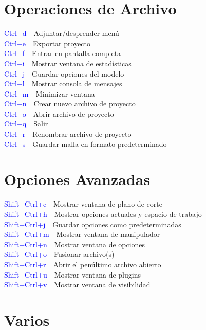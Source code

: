 \documentclass[10pt, twocolumn]{article}
\newcommand{\command}[2]{\textcolor{blue}{#1}~\dotfill{}~#2\\} %
\begin{document}
\section*{Operaciones de Archivo}

\command{Ctrl+d}{Adjuntar/desprender menú}
\command{Ctrl+e}{Exportar proyecto}
\command{Ctrl+f}{Entrar en pantalla completa}
\command{Ctrl+i}{Mostrar ventana de estadísticas}
\command{Ctrl+j}{Guardar opciones del modelo}
\command{Ctrl+l}{Mostrar consola de mensajes}
\command{Ctrl+m}{Minimizar ventana}
\command{Ctrl+n}{Crear nuevo archivo de proyecto}
\command{Ctrl+o}{Abrir archivo de proyecto}
\command{Ctrl+q}{Salir}
\command{Ctrl+r}{Renombrar archivo de proyecto}
\command{Ctrl+s}{Guardar malla en formato predeterminado}

\section*{Opciones Avanzadas}

\command{Shift+Ctrl+c}{Mostrar ventana de plano de corte}
\command{Shift+Ctrl+h}{Mostrar opciones actuales y espacio de trabajo}
\command{Shift+Ctrl+j}{Guardar opciones como predeterminadas}
\command{Shift+Ctrl+m}{Mostrar ventana de manipulador}
\command{Shift+Ctrl+n}{Mostrar ventana de opciones}
\command{Shift+Ctrl+o}{Fusionar archivo(s)}
\command{Shift+Ctrl+r}{Abrir el penúltimo archivo abierto}
\command{Shift+Ctrl+u}{Mostrar ventana de plugins}
\command{Shift+Ctrl+v}{Mostrar ventana de visibilidad}

\section*{Varios}
\end{document}
